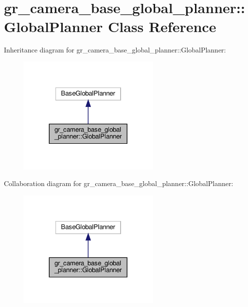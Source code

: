 \hypertarget{classgr__camera__base__global__planner_1_1GlobalPlanner}{}\section{gr\+\_\+camera\+\_\+base\+\_\+global\+\_\+planner\+:\+:Global\+Planner Class Reference}
\label{classgr__camera__base__global__planner_1_1GlobalPlanner}


Inheritance diagram for gr\+\_\+camera\+\_\+base\+\_\+global\+\_\+planner\+:\+:Global\+Planner\+:
\nopagebreak
\begin{figure}[H]
\begin{center}
\leavevmode
\includegraphics[width=200pt]{classgr__camera__base__global__planner_1_1GlobalPlanner__inherit__graph}
\end{center}
\end{figure}


Collaboration diagram for gr\+\_\+camera\+\_\+base\+\_\+global\+\_\+planner\+:\+:Global\+Planner\+:
\nopagebreak
\begin{figure}[H]
\begin{center}
\leavevmode
\includegraphics[width=200pt]{classgr__camera__base__global__planner_1_1GlobalPlanner__coll__graph}
\end{center}
\end{figure}
